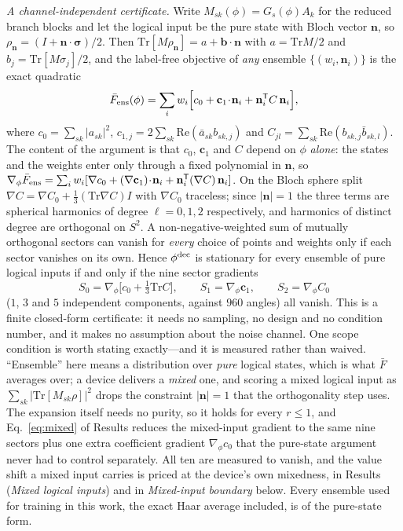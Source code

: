 \documentclass[aps,prxquantum,reprint,superscriptaddress]{revtex4-2}
\newcommand{\tr}{\mathrm{Tr}}
\newcommand{\re}{\mathrm{Re}}
\begin{document}
\emph{A channel-independent certificate.} Write $M_{sk}(\phi)=G_s(\phi)A_k$ for
the reduced branch blocks and let the logical input be the pure state with Bloch
vector $\mathbf n$, so $\rho_{\mathbf n}=(I+\mathbf n\!\cdot\!
\boldsymbol\sigma)/2$. Then $\tr[M\rho_{\mathbf n}]=a+\mathbf b\!\cdot\!\mathbf n$
with $a=\tr M/2$ and $b_j=\tr[M\sigma_j]/2$, and the label-free objective of
\emph{any} ensemble $\{(w_i,\mathbf n_i)\}$ is the exact quadratic
\begin{equation}
\bar F_{\rm ens}(\phi)=\sum_i w_i\Big[c_0+\mathbf c_1\!\cdot\!\mathbf n_i+
\mathbf n_i^{\mathsf T}C\,\mathbf n_i\Big],
\label{eq:bloch}
\end{equation}
where $c_0=\sum_{sk}|a_{sk}|^2$, $c_{1,j}=2\sum_{sk}\re(\bar a_{sk}b_{sk,j})$ and
$C_{jl}=\sum_{sk}\re(b_{sk,j}\bar b_{sk,l})$. The content of the argument is that
$c_0$, $\mathbf c_1$ and $C$ depend on $\phi$ \emph{alone}: the states and the
weights enter only through a fixed polynomial in $\mathbf n$, so
$\nabla_\phi\bar F_{\rm ens}=\sum_i w_i[\nabla c_0+(\nabla\mathbf c_1)\!\cdot\!
\mathbf n_i+\mathbf n_i^{\mathsf T}(\nabla C)\,\mathbf n_i]$. On the Bloch sphere
split $\nabla C=\nabla C_0+\tfrac13(\tr\nabla C)I$ with $\nabla C_0$ traceless;
since $|\mathbf n|=1$ the three terms are spherical harmonics of degree
$\ell=0,1,2$ respectively, and harmonics of distinct degree are orthogonal on
$S^2$. A non-negative-weighted sum of mutually orthogonal sectors can vanish for
\emph{every} choice of points and weights only if each sector vanishes on its own.
Hence $\phi^{\rm dec}$ is stationary for every ensemble of pure logical inputs if
and only if the nine sector gradients
\begin{equation}
S_0=\nabla_\phi\!\big[c_0+\tfrac13\tr C\big],\qquad
S_1=\nabla_\phi\mathbf c_1,\qquad
S_2=\nabla_\phi C_0
\label{eq:sectors}
\end{equation}
($1$, $3$ and $5$ independent components, against $960$ angles) all vanish. This
is a finite closed-form certificate: it needs no sampling, no design and no
condition number, and it makes no assumption about the noise channel. One scope
condition is worth stating exactly---and it is measured rather than waived.
``Ensemble'' here means a distribution over \emph{pure} logical states, which is
what $\bar F$ averages over; a device delivers a \emph{mixed} one, and scoring a
mixed logical input as $\sum_{sk}|\tr[M_{sk}\rho]|^2$ drops the constraint
$|\mathbf n|=1$ that the orthogonality step uses. The expansion itself needs no
purity, so it holds for every $r\le1$, and Eq.~\eqref{eq:mixed} of Results reduces
the mixed-input gradient to the same nine sectors plus one extra coefficient
gradient $\nabla_\phi c_0$ that the pure-state argument never had to control
separately. All ten are measured to vanish, and the value shift a mixed input
carries is priced at the device's own mixedness, in Results (\emph{Mixed logical
inputs}) and in \emph{Mixed-input boundary} below. Every
ensemble used for training in this work, the exact Haar average included, is of
the pure-state form.
\end{document}
